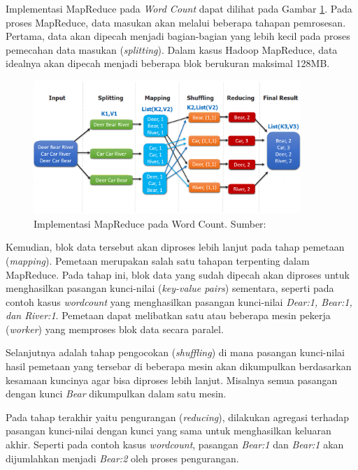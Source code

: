 Implementasi MapReduce pada \textit{Word Count}\cite{KOMPARASIKECEPATANHADOOP} dapat dilihat pada Gambar \ref{fig:mapreduce-wordcount}. Pada proses MapReduce, data masukan akan melalui beberapa tahapan pemrosesan. Pertama, data akan dipecah menjadi bagian-bagian yang lebih kecil pada proses pemecahan data masukan (\textit{splitting}). Dalam kasus Hadoop MapReduce, data idealnya akan dipecah menjadi beberapa blok berukuran maksimal 128MB.

\begin{figure}[h!]
    \centering
    \includegraphics[width=0.9\textwidth]{figures/ch02/map-reduce-word-count-oreilly.png}
    \caption{Implementasi MapReduce pada Word Count. Sumber:  \cite{MapReduceDistributedComputing}}
    \label{fig:mapreduce-wordcount}
\end{figure}

Kemudian, blok data tersebut akan diproses lebih lanjut pada tahap pemetaan (\textit{mapping}). Pemetaan merupakan salah satu tahapan terpenting dalam MapReduce. Pada tahap ini, blok data yang sudah dipecah akan diproses untuk menghasilkan pasangan kunci-nilai (\textit{key-value pairs}) sementara, seperti pada contoh kasus \textit{wordcount} yang menghasilkan pasangan kunci-nilai \textit{Dear:1, Bear:1, dan River:1}. Pemetaan dapat melibatkan satu atau beberapa mesin pekerja (\textit{worker}) yang memproses blok data secara paralel.

Selanjutnya adalah tahap pengocokan (\textit{shuffling}) di mana pasangan kunci-nilai hasil pemetaan yang tersebar di beberapa mesin akan dikumpulkan berdasarkan kesamaan kuncinya agar bisa diproses lebih lanjut. Misalnya semua pasangan dengan kunci \textit{Bear} dikumpulkan dalam satu mesin.

Pada tahap terakhir yaitu pengurangan (\textit{reducing}), dilakukan agregasi terhadap pasangan kunci-nilai dengan kunci yang sama untuk menghasilkan keluaran akhir. Seperti pada contoh kasus \textit{wordcount}, pasangan \textit{Bear:1} dan \textit{Bear:1} akan dijumlahkan menjadi \textit{Bear:2} oleh proses pengurangan.

